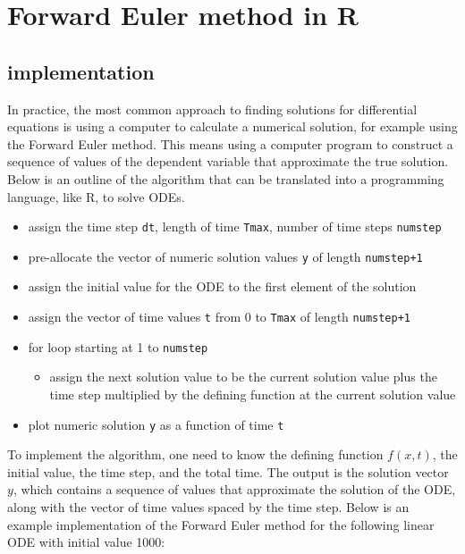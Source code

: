 \documentclass[
  letterpaper,
  DIV=11,
  numbers=noendperiod]{scrreprt}
\providecommand{\tightlist}{%
  \setlength{\itemsep}{0pt}\setlength{\parskip}{0pt}}\usepackage{longtable,booktabs,array}
\begin{document}
\hypertarget{forward-euler-method-in-r}{%
\section{Forward Euler method in R}\label{forward-euler-method-in-r}}

\label{sec:comp16}

\hypertarget{implementation}{%
\subsection{implementation}\label{implementation}}

In practice, the most common approach to finding solutions for
differential equations is using a computer to calculate a numerical
solution, for example using the Forward Euler method. This means using a
computer program to construct a sequence of values of the dependent
variable that approximate the true solution. Below is an outline of the
algorithm that can be translated into a programming language, like R, to
solve ODEs.

\begin{itemize}
\item
  assign the time step \texttt{dt}, length of time \texttt{Tmax}, number
  of time steps \texttt{numstep}
\item
  pre-allocate the vector of numeric solution values \texttt{y} of
  length \texttt{numstep+1}
\item
  assign the initial value for the ODE to the first element of the
  solution
\item
  assign the vector of time values \texttt{t} from 0 to \texttt{Tmax} of
  length \texttt{numstep+1}
\item
  for loop starting at 1 to \texttt{numstep}

  \begin{itemize}
  \tightlist
  \item
    assign the next solution value to be the current solution value plus
    the time step multiplied by the defining function at the current
    solution value
  \end{itemize}
\item
  plot numeric solution \texttt{y} as a function of time \texttt{t}
\end{itemize}

To implement the algorithm, one need to know the defining function
\(f(x,t)\), the initial value, the time step, and the total time. The
output is the solution vector \(y\), which contains a sequence of values
that approximate the solution of the ODE, along with the vector of time
values spaced by the time step. Below is an example implementation of
the Forward Euler method for the following linear ODE with initial value
1000:
\end{document}
